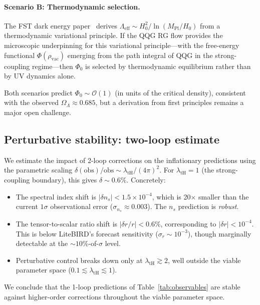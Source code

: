 \documentclass[aps,prd,twocolumn,superscriptaddress,nofootinbib]{revtex4-2}
\begin{document}
\paragraph{Scenario B: Thermodynamic selection.}
The FST dark energy paper~\cite{GeigerDE2026} derives $\Lambda_\mathrm{eff} \sim H_0^2/\ln(M_\mathrm{Pl}/H_0)$ from a thermodynamic variational principle. If the QQG RG flow provides the microscopic underpinning for this variational principle---with the free-energy functional $\Phi(\rho_\mathrm{vac})$ emerging from the path integral of QQG in the strong-coupling regime---then $\Phi_0$ is selected by thermodynamic equilibrium rather than by UV dynamics alone.

Both scenarios predict $\Phi_0 \sim \mathcal{O}(1)$ (in units of the critical density), consistent with the observed $\Omega_\Lambda \approx 0.685$, but a derivation from first principles remains a major open challenge.

\subsection{Perturbative stability: two-loop estimate}
\label{sec:two-loop}

We estimate the impact of 2-loop corrections on the inflationary predictions using the parametric scaling $\delta(\mathrm{obs})/\mathrm{obs} \sim \lambda_\mathrm{tH}/(4\pi)^2$. For $\lambda_\mathrm{tH} = 1$ (the strong-coupling boundary), this gives $\delta \sim 0.6\%$. Concretely:

\begin{itemize}
\item The spectral index shift is $|\delta n_s| < 1.5 \times 10^{-4}$, which is 20$\times$ smaller than the current $1\sigma$ observational error ($\sigma_{n_s} \approx 0.003$). The $n_s$ prediction is \textit{robust}.
\item The tensor-to-scalar ratio shift is $|\delta r/r| < 0.6\%$, corresponding to $|\delta r| < 10^{-4}$. This is below LiteBIRD's forecast sensitivity ($\sigma_r \sim 10^{-3}$), though marginally detectable at the $\sim 10\%$-of-$\sigma$ level.
\item Perturbative control breaks down only at $\lambda_\mathrm{tH} \gtrsim 2$, well outside the viable parameter space ($0.1 \lesssim \lambda_\mathrm{tH} \lesssim 1$).
\end{itemize}

We conclude that the 1-loop predictions of Table~\ref{tab:observables} are stable against higher-order corrections throughout the viable parameter space.
\end{document}
